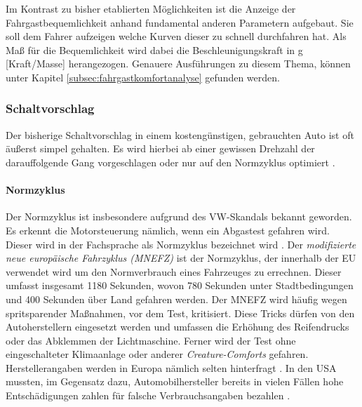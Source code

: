 Im Kontrast zu bisher etablierten Möglichkeiten ist die Anzeige der Fahrgastbequemlichkeit anhand fundamental anderen Parametern aufgebaut. Sie soll dem Fahrer aufzeigen welche Kurven dieser zu schnell durchfahren hat. Als Maß für die Bequemlichkeit wird dabei die Beschleunigungskraft in g [Kraft/Masse] herangezogen. Genauere Ausführungen zu diesem Thema, können unter Kapitel \ref{subsec:fahrgastkomfortanalyse} gefunden werden.

\subsubsection{Schaltvorschlag}
Der bisherige Schaltvorschlag in einem kostengünstigen, gebrauchten Auto ist oft äußerst simpel gehalten. Es wird hierbei ab einer gewissen Drehzahl der darauffolgende Gang vorgeschlagen oder nur auf den Normzyklus optimiert \cite{SIMR.CH1-Fahrstil-Analyse.Schaltempfehlung}.
\paragraph{Normzyklus}
Der Normzyklus ist insbesondere aufgrund des VW-Skandals bekannt geworden. Es erkennt die Motorsteuerung nämlich, wenn ein Abgastest gefahren wird. Dieser wird in der Fachsprache als Normzyklus bezeichnet wird \cite{SIMR.CH1-fahrstil-analyse.Normzyklus}. Der \textit{modifizierte neue europäische Fahrzyklus (MNEFZ)} ist der Normzyklus, der innerhalb der EU verwendet wird um den Normverbrauch eines Fahrzeuges zu errechnen. Dieser umfasst insgesamt 1180 Sekunden, wovon 780 Sekunden unter Stadtbedingungen und 400 Sekunden über Land gefahren werden. Der MNEFZ wird häufig wegen spritsparender Maßnahmen, vor dem Test, kritisiert. Diese Tricks dürfen von den Autoherstellern eingesetzt werden und umfassen die Erhöhung des Reifendrucks oder das Abklemmen der Lichtmaschine. Ferner wird der Test ohne eingeschalteter Klimaanlage oder anderer \textit{Creature-Comforts} gefahren. Herstellerangaben werden in Europa nämlich selten hinterfragt \cite{SIMR.CH1-fahrstil-analyse.MNEFZ}. In den USA mussten, im Gegensatz dazu, Automobilhersteller bereits in vielen Fällen hohe Entschädigungen zahlen für falsche Verbrauchsangaben bezahlen \cite{SIMR.CH1-fahrstil-analyse.falscherVerbrauchUS}.
